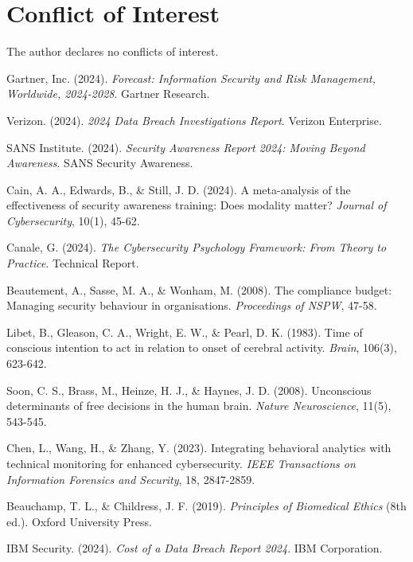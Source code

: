 \documentclass[10pt, twocolumn]{article}
\begin{document}
\section*{Conflict of Interest}

The author declares no conflicts of interest.

\begin{thebibliography}{99}

Gartner, Inc. (2024). \textit{Forecast: Information Security and Risk Management, Worldwide, 2024-2028}. Gartner Research.

Verizon. (2024). \textit{2024 Data Breach Investigations Report}. Verizon Enterprise.

SANS Institute. (2024). \textit{Security Awareness Report 2024: Moving Beyond Awareness}. SANS Security Awareness.

Cain, A. A., Edwards, B., \& Still, J. D. (2024). A meta-analysis of the effectiveness of security awareness training: Does modality matter? \textit{Journal of Cybersecurity}, 10(1), 45-62.

Canale, G. (2024). \textit{The Cybersecurity Psychology Framework: From Theory to Practice}. Technical Report.

Beautement, A., Sasse, M. A., \& Wonham, M. (2008). The compliance budget: Managing security behaviour in organisations. \textit{Proceedings of NSPW}, 47-58.

Libet, B., Gleason, C. A., Wright, E. W., \& Pearl, D. K. (1983). Time of conscious intention to act in relation to onset of cerebral activity. \textit{Brain}, 106(3), 623-642.

Soon, C. S., Brass, M., Heinze, H. J., \& Haynes, J. D. (2008). Unconscious determinants of free decisions in the human brain. \textit{Nature Neuroscience}, 11(5), 543-545.

Chen, L., Wang, H., \& Zhang, Y. (2023). Integrating behavioral analytics with technical monitoring for enhanced cybersecurity. \textit{IEEE Transactions on Information Forensics and Security}, 18, 2847-2859.

Beauchamp, T. L., \& Childress, J. F. (2019). \textit{Principles of Biomedical Ethics} (8th ed.). Oxford University Press.

IBM Security. (2024). \textit{Cost of a Data Breach Report 2024}. IBM Corporation.

\end{thebibliography}
\end{document}

